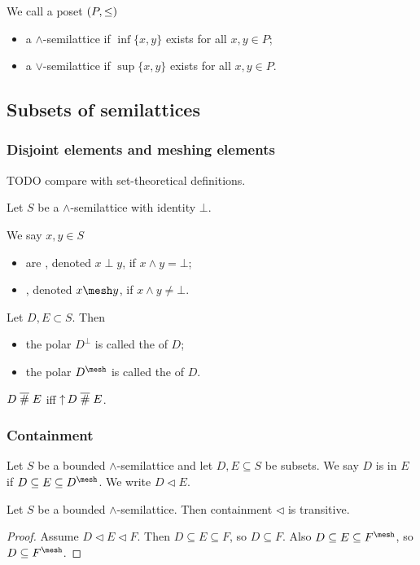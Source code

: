 We call a poset $\left( P,\leq \right)$
\begin{itemize}
\item a $\wedge$-semilattice if $\inf\{x,y\}$ exists for all $x,y\in P$;
\item a $\vee$-semilattice if $\sup\{x,y\}$ exists for all $x,y\in P$.
\end{itemize}

\subsection{Subsets of semilattices}
\subsubsection{Disjoint elements and meshing elements}
TODO compare with set-theoretical definitions.
\begin{definition}
Let $S$ be a $\wedge$-semilattice with identity $\bot$.

We say $x,y\in S$
\begin{itemize}
\item are , denoted $x \perp y$, if $x\wedge y = \bot$;
\item {}, denoted $x\mesh y$, if $x\wedge y \neq \bot$.
\end{itemize}

Let $D, E \subset S$. Then
\begin{itemize}
\item the polar $D^\perp$ is called the  of $D$;
\item the polar $D^{\mesh}$ is called the  of $D$.
\end{itemize}
\end{definition}

\begin{lemma}
$D\mathrel{\overline{\#}} E$ iff $\operatorname{\uparrow} D \mathrel{\overline{\#}} E$.
\end{lemma}

\subsubsection{Containment}
\begin{definition}
Let $S$ be a bounded $\wedge$-semilattice and let $D,E \subseteq S$ be subsets. We say $D$ is  in $E$ if $D \subseteq E \subseteq D^{\mesh}$. We write $D \lhd E$.
\end{definition}

\begin{lemma}
Let $S$ be a bounded $\wedge$-semilattice. Then containment $\lhd$ is transitive.
\end{lemma}
\begin{proof}
Assume $D \lhd E \lhd F$. Then $D\subseteq E\subseteq F$, so $D\subseteq F$. Also $D\subseteq E\subseteq F^{\mesh}$, so $D\subseteq F^{\mesh}$.
\end{proof}


